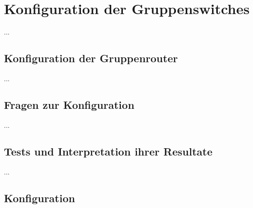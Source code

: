 \documentclass{article}
\begin{document}
\section{Konfiguration der Gruppenswitches}

...

\subsection{Konfiguration der Gruppenrouter}

...

\subsection{Fragen zur Konfiguration}

...

\subsection{Tests und Interpretation ihrer Resultate}

...

\subsection{Konfiguration}

% 
% 
\end{document}
